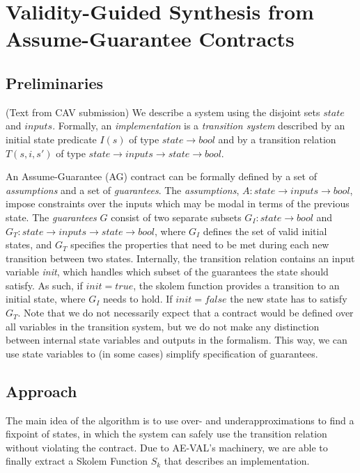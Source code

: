\documentclass[10pt,conference]{IEEEtran}
\begin{document}
\section{Validity-Guided Synthesis from Assume-Guarantee Contracts}

\subsection{Preliminaries}
(Text from CAV submission)
We describe a system using the disjoint sets $state$ and $inputs$.
Formally, an \emph{implementation} is a \emph{transition system}
described by an initial state predicate $I(s)$ of type $state \to
bool$ and by a transition relation $T(s,i,s')$ of type $state \to
inputs \to state \to bool$.

An Assume-Guarantee (AG) contract can be formally defined by a set of
\emph{assumptions} and a set of \emph{guarantees}. The
\emph{assumptions}, $A: state \rightarrow inputs \rightarrow bool$,
impose constraints over the inputs which may be modal in terms of the
previous state. The \emph{guarantees} $G$ consist of two separate
subsets $G_I: state \rightarrow bool$ and $G_T: state \rightarrow
inputs \rightarrow state \rightarrow bool$, where $G_I$ defines the
set of valid initial states, and $G_T$ specifies the properties that
need to be met during each new transition between two states. Internally, the transition relation contains an input variable
\textit{init}, which handles which subset of the guarantees the state should
satisfy. As such, if $init = true$, the skolem function provides a transition to
an initial state, where $G_I$ needs to hold. If $init = false$ the new state has
to satisfy $G_T$. Note that we do not necessarily expect that a contract would
be defined over all variables in the transition system, but we do not make any
distinction between internal state variables and outputs in the
formalism. This way, we can use state variables to (in some cases)
simplify specification of guarantees.

\subsection{Approach}

The main idea of the algorithm is to use over- and underapproximations to
find a fixpoint of states, in which the system can safely use
the transition relation without violating the contract. Due to AE-VAL's
machinery, we are able to finally extract a Skolem Function $S_k$ that describes an implementation.
\end{document}
